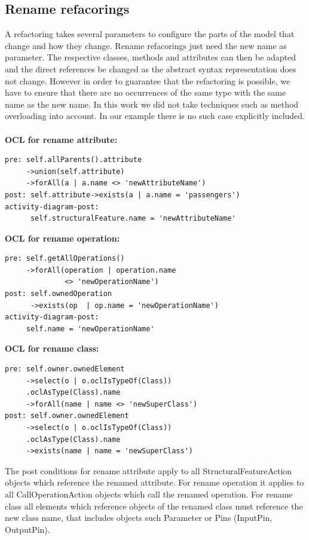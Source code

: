 \documentclass{llncs}
\begin{document}
\subsection{Rename refacorings}
\label{sec:renames}
A refactoring takes several parameters to configure the parts of the model that change and how they change. Rename 
refacorings just need the new name as parameter. The respective classes, methods and attributes can then be adapted 
and the direct references be changed as the abstract syntax representation does not change. However in order to guarantee that the 
refactoring is possible, we have to ensure that there are no occurrences of the same type with the same name as the 
new name. In this work we did not take techniques such as method overloading into account. In our example there is 
no such case explicitly included.
\\ \\
\textbf{OCL for rename attribute:}
\begin{lstlisting}
pre: self.allParents().attribute
     ->union(self.attribute)
     ->forAll(a | a.name <> 'newAttributeName')
post: self.attribute->exists(a | a.name = 'passengers')
activity-diagram-post:
      self.structuralFeature.name = 'newAttributeName'
\end{lstlisting}
\textbf{OCL for rename operation:}
\begin{lstlisting}
pre: self.getAllOperations()
     ->forAll(operation | operation.name
              <> 'newOperationName')
post: self.ownedOperation
      ->exists(op  | op.name = 'newOperationName')
activity-diagram-post:
     self.name = 'newOperationName'
\end{lstlisting}
\textbf{OCL for rename class:}
\begin{lstlisting}
pre: self.owner.ownedElement
     ->select(o | o.oclIsTypeOf(Class))
     .oclAsType(Class).name
     ->forAll(name | name <> 'newSuperClass')
post: self.owner.ownedElement
     ->select(o | o.oclIsTypeOf(Class))
     .oclAsType(Class).name
     ->exists(name | name = 'newSuperClass')
\end{lstlisting}

The post conditions for rename attribute apply to all StructuralFeatureAction objects
which reference the renamed attribute. For rename operation it applies to all CallOperationAction objects which
call the renamed operation. For rename class all elements which reference objects of the renamed class must reference
the new class name, that includes objects such Parameter or Pins (InputPin, OutputPin).
\end{document}
